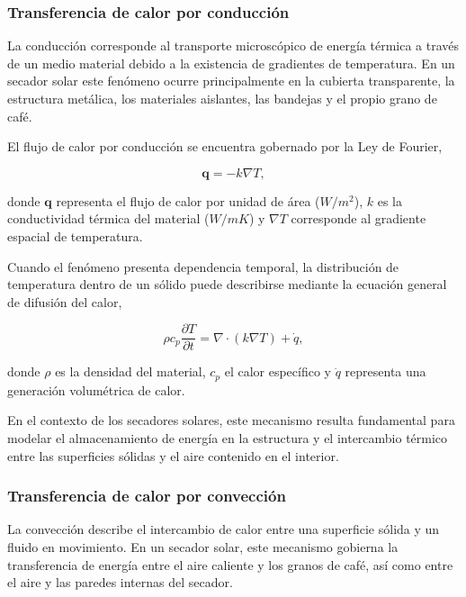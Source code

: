 \subsubsection{Transferencia de calor por conducción}

La conducción corresponde al transporte microscópico de energía térmica a través de un medio material debido a la existencia de gradientes de temperatura. En un secador solar este fenómeno ocurre principalmente en la cubierta transparente, la estructura metálica, los materiales aislantes, las bandejas y el propio grano de café.

El flujo de calor por conducción se encuentra gobernado por la Ley de Fourier,

\begin{equation}
\mathbf{q}=-k\nabla T,
\label{eq:fourier}
\end{equation}

donde $\mathbf{q}$ representa el flujo de calor por unidad de área ($W/m^2$), $k$ es la conductividad térmica del material ($W/mK$) y $\nabla T$ corresponde al gradiente espacial de temperatura.

Cuando el fenómeno presenta dependencia temporal, la distribución de temperatura dentro de un sólido puede describirse mediante la ecuación general de difusión del calor,

\begin{equation}
\rho c_p\frac{\partial T}{\partial t}
=
\nabla\cdot(k\nabla T)+\dot q,
\label{eq:heatdiffusion}
\end{equation}

donde $\rho$ es la densidad del material, $c_p$ el calor específico y $\dot q$ representa una generación volumétrica de calor.

En el contexto de los secadores solares, este mecanismo resulta fundamental para modelar el almacenamiento de energía en la estructura y el intercambio térmico entre las superficies sólidas y el aire contenido en el interior.

\subsubsection{Transferencia de calor por convección}

La convección describe el intercambio de calor entre una superficie sólida y un fluido en movimiento. En un secador solar, este mecanismo gobierna la transferencia de energía entre el aire caliente y los granos de café, así como entre el aire y las paredes internas del secador.

